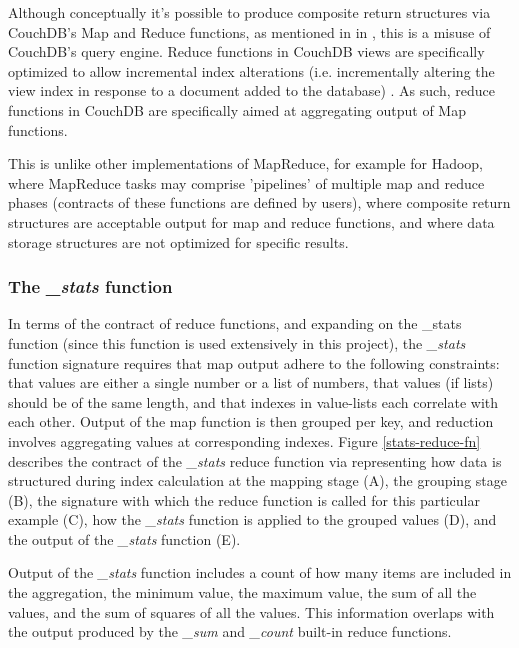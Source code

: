 Although conceptually it's possible to produce composite return structures via CouchDB's Map and Reduce functions, as mentioned in in \cite{reduceFunctions}, this is a misuse of CouchDB's query engine. Reduce functions in CouchDB views are specifically optimized to allow incremental index alterations (i.e. incrementally altering the view index in response to a document added to the database) \cite{reduceFunctions}. As such, reduce functions in CouchDB are specifically aimed at aggregating output of Map functions.

This is unlike other implementations of MapReduce, for example for Hadoop, where MapReduce tasks may comprise 'pipelines' of multiple map and reduce phases (contracts of these functions are defined by users), where composite return structures are acceptable output for map and reduce functions, and where data storage structures are not optimized for specific results.

\subsubsection{The \textit{\_stats} function}
In terms of the contract of reduce functions, and expanding on the \_stats function (since this function is used extensively in this project), the \textit{\_stats} function signature requires that map output adhere to the following constraints: that values are either a single number or a list of numbers, that values (if lists) should be of the same length, and that indexes in value-lists each correlate with each other. Output of the map function is then grouped per key, and reduction involves aggregating values at corresponding indexes. Figure \ref{stats-reduce-fn} describes the contract of the \textit{\_stats} reduce function via representing how data is structured during index calculation at the mapping stage (A), the grouping stage (B), the signature with which the reduce function is called for this particular example (C), how the \textit{\_stats} function is applied to the grouped values (D), and the output of the \textit{\_stats} function (E).

Output of the \textit{\_stats} function includes a count of how many items are included in the aggregation, the minimum value, the maximum value, the sum of all the values, and the sum of squares of all the values. This information overlaps with the output produced by the \textit{\_sum} and \textit{\_count} built-in reduce functions.

